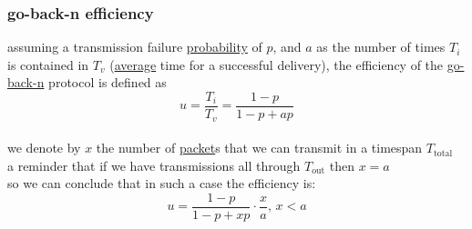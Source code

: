 \documentclass[a4paper,12pt]{article}
\begin{document}
\subsubsection{go-back-n efficiency}
\label{sec:orge3dca86}
assuming a transmission failure \href{20220813151352-probability.org}{probability} of \(p\), and \(a\) as the number of times \(T_i\) is contained in \(T_v\) (\href{20220813152209-average.org}{average} time for a successful delivery), the efficiency of the \hyperref[sec:org72dc15c]{go-back-n} protocol is defined as\\
\[
u = \frac{T_i}{T_v} = \frac{1-p}{1-p+ap}
\]\\
we denote by \(x\) the number of \hyperref[sec:orgd4c2e7b]{packet}s that we can transmit in a timespan \(T_\text{total}\)\\
a reminder that if we have transmissions all through \(T_\text{out}\) then \(x=a\)\\
so we can conclude that in such a case the efficiency is:\\
\[
u = \frac{1-p}{1-p+xp} \cdot \frac{x}{a},\, x < a
\]\\
\end{document}
